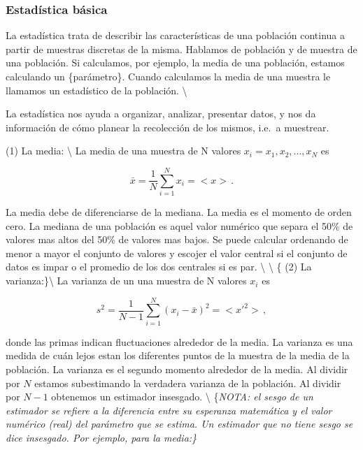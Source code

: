 \documentclass[
]{agujournal2019}
\begin{document}
\hypertarget{estaduxedstica-buxe1sica}{%
\subsubsection{Estadística básica}\label{estaduxedstica-buxe1sica}}

\label{Estadistica}

La estadística trata de describir las características de una población
continua a partir de muestras discretas de la misma. Hablamos de
población y de muestra de una población. Si calculamos, por ejemplo, la
media de una población, estamos calculando un \{parámetro\}. Cuando
calculamos la media de una muestra le llamamos un estadístico de la
población. \textbackslash{}

La estadística nos ayuda a organizar, analizar, presentar datos, y nos
da información de cómo planear la recolección de los mismos, i.e.~a
muestrear.

\begin{center}
\end{center}

\vspace{0.5cm}

\noindent (1) La media: \textbackslash{} La media de una muestra de N
valores \(x_i=x_1,x_2,...,x_N\) es

\begin{equation}
\bar{x}=\frac{1}{N}\sum^N_{i=1}x_i=<x>\,.
\end{equation}

La media debe de diferenciarse de la mediana. La media es el momento de
orden cero. La mediana de una población es aquel valor numérico que
separa el 50\% de valores mas altos del 50\% de valores mas bajos. Se
puede calcular ordenando de menor a mayor el conjunto de valores y
escojer el valor central si el conjunto de datos es impar o el promedio
de los dos centrales si es par. \textbackslash{} \textbackslash{} \{ (2)
La varianza:\}\textbackslash{} La varianza de un una muestra de N
valores \(x_i\) es

\begin{equation}
s^2=\frac{1}{N-1}\sum^N_{i=1}(x_i-\bar{x})^2=<x'^2>\,,
\end{equation}

donde las primas indican fluctuaciones alrededor de la media. La
varianza es una medida de cuán lejos estan los diferentes puntos de la
muestra de la media de la población. La varianza es el segundo momento
alrededor de la media. Al dividir por \(N\) estamos subestimando la
verdadera varianza de la población. Al dividir por \(N-1\) obtenemos un
estimador insesgado. \textbackslash{}
\{\it NOTA: el sesgo de un estimador se refiere a la diferencia entre
su esperanza matemática y el valor numérico (real) del parámetro que se
estima. Un estimador que no tiene sesgo se dice insesgado. Por ejemplo,
para la media:\}
\end{document}
